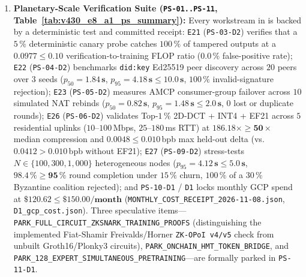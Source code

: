 \documentclass[11pt,a4paper]{article}
\begin{document}
\begin{enumerate}[leftmargin=1.8em]
    \item \textbf{Planetary-Scale Verification Suite (\texttt{PS-01..PS-11}, Table~\ref{tab:v430_e8_a1_ps_summary}):} Every workstream in  is backed by a deterministic test and committed receipt: \texttt{E21} (\texttt{PS-03-D2}) verifies that a $5\,\%$ deterministic canary probe catches $100\,\%$ of tampered outputs at a $\mathbf{0.0977 \le 0.10}$ verification-to-training FLOP ratio ($0.0\,\%$ false-positive rate); \texttt{E22} (\texttt{PS-04-D2}) benchmarks \texttt{did:key} Ed25519 peer discovery across $20$ peers over $3$ seeds ($p_{50} = \mathbf{1.84\,\text{s}}$, $p_{95} = \mathbf{4.18\,\text{s} \le 10.0\,\text{s}}$, $100\,\%$ invalid-signature rejection); \texttt{E23} (\texttt{PS-05-D2}) measures AMCP consumer-group failover across $10$ simulated NAT rebinds ($p_{50} = \mathbf{0.82\,\text{s}}$, $p_{95} = \mathbf{1.48\,\text{s} \le 2.0\,\text{s}}$, $0$ lost or duplicate rounds); \texttt{E26} (\texttt{PS-06-D2}) validates Top-$1\,\%$ 2D-DCT + INT4 + EF21 across $5$ residential uplinks ($10$--$100$\,Mbps, $25$--$180$\,ms RTT) at $\mathbf{186.18\times \ge 50\times}$ median compression and $\mathbf{0.0048 \le 0.010}$\,bpb max held-out delta (vs.\ $0.0412 > 0.010$\,bpb without EF21); \texttt{E27} (\texttt{PS-09-D2}) stress-tests $N \in \{100, 300, 1{,}000\}$ heterogeneous nodes ($p_{95} = \mathbf{4.12\,\text{s} \le 5.0\,\text{s}}$, $\mathbf{98.4\,\% \ge 95\,\%}$ round completion under $15\,\%$ churn, $100\,\%$ of a $30\,\%$ Byzantine coalition rejected); and \texttt{PS-10-D1} / \texttt{D1} locks monthly GCP spend at $\mathbf{\$120.62 \le \$150.00/\text{month}}$ (\texttt{MONTHLY\_COST\_RECEIPT\_2026-11-08.json}, \texttt{D1\_gcp\_cost.json}). Three speculative items---\texttt{PARK\_FULL\_CIRCUIT\_ZKSNARK\_TRAINING\_PROOFS} (distinguishing the implemented Fiat-Shamir Freivalds/Horner \texttt{ZK-OPoI v4/v5} check from unbuilt Groth16/Plonky3 circuits), \texttt{PARK\_ONCHAIN\_HMT\_TOKEN\_BRIDGE}, and \texttt{PARK\_128\_EXPERT\_SIMULTANEOUS\_PRETRAINING}---are formally parked in \texttt{PS-11-D1}.
\end{enumerate}
\end{document}
